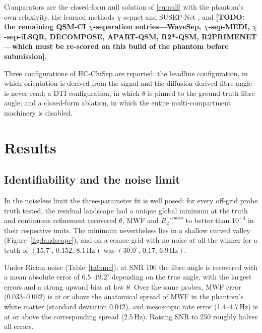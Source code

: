 \documentclass[AMA,STIX2COL,Linenumberson]{MRM}
\newcommand{\TODO}[1]{{\color{red}\textbf{[TODO: #1]}}}
\newcommand{\TODO}[1]{}
\begin{document}
Comparators are the closed-form null solution of \eqref{eq:null} with the phantom's own relaxivity, the learned methods $\chi$-sepnet \cite{kim_chisepnet_2025} and SUSEP-Net \cite{susepnet_TODO}, and \TODO{the remaining QSM-CI $\chi$-separation entries---WaveSep, $\chi$-sep-MEDI, $\chi$-sep-iLSQR, DECOMPOSE, APART-QSM, R2*-QSM, R2PRIMENET---which must be re-scored on this build of the phantom before submission}.

Three configurations of HC-ChiSep are reported: the headline configuration, in which orientation is derived from the signal and the diffusion-derived fibre angle is never read; a DTI configuration, in which $\theta$ is pinned to the ground-truth fibre angle; and a closed-form ablation, in which the entire multi-compartment machinery is disabled.


\section{Results}

\subsection{Identifiability and the noise limit}
\label{sec:res-ident}

In the noiseless limit the three-parameter fit is well posed: for every off-grid probe truth tested, the residual landscape had a unique global minimum at the truth and continuous refinement recovered $\theta$, MWF and $R_2'^{\,\mathrm{meso}}$ to better than $10^{-3}$ in their respective units. The minimum nevertheless lies in a shallow curved valley (Figure~\ref{fig:landscape}), and on a coarse grid with no noise at all the winner for a truth of $(15.7^\circ,\,0.152,\,8.1\,\mathrm{Hz})$ was $(30.0^\circ,\,0.17,\,6.9\,\mathrm{Hz})$.

Under Rician noise (Table~\ref{tab:mc}), at SNR 100 the fibre angle is recovered with a mean absolute error of $6.5$--$19.2^\circ$ depending on the true angle, with the largest errors and a strong upward bias at low $\theta$. Over the same probes, MWF error (0.033--0.062) is at or above the anatomical spread of MWF in the phantom's white matter (standard deviation 0.042), and mesoscopic rate error (1.4--4.7\,Hz) is at or above the corresponding spread (2.5\,Hz). Raising SNR to 250 roughly halves all errors.
\end{document}
